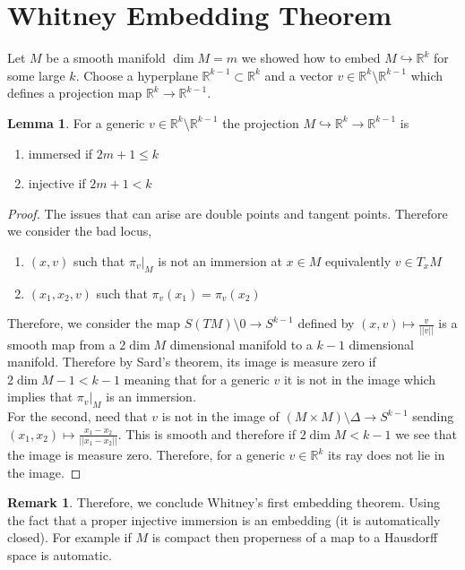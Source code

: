 \documentclass[12pt]{extarticle}
\newcommand{\R}{\mathbb{R}}
\theoremstyle{definition}
\newtheorem{lemma}[theorem]{Lemma}
\newtheorem{remark}{Remark}
\newcommand{\embed}{\hookrightarrow}
\begin{document}
\section{Whitney Embedding Theorem}

Let $M$ be a smooth manifold $\dim{M} = m$ we showed how to embed $M \embed \R^k$ for some large $k$. Choose a hyperplane $\R^{k-1} \subset \R^k$ and a vector $v \in \R^k \setminus \R^{k-1}$ which defines a projection map $\R^k \to \R^{k-1}$. 

\begin{lemma}
For a generic $v \in \R^k \setminus \R^{k-1}$ the projection $M \embed \R^k \to \R^{k-1}$ is
\begin{enumerate}
\item immersed if $2 m + 1 \le k$
\item injective if $2 m + 1 < k$
\end{enumerate}
\end{lemma}

\begin{proof}
The issues that can arise are double points and tangent points. Therefore we consider the bad locus,
\begin{enumerate}
\item $(x,v)$ such that $\pi_v |_M$ is not an immersion at $x \in M$ equivalently $v \in T_x M$
\item $(x_1, x_2, v)$ such that $\pi_v(x_1) = \pi_v(x_2)$ 
\end{enumerate}
Therefore, we consider the map $S(TM) \setminus 0 \to S^{k-1}$ defined by $(x,v) \mapsto \frac{v}{||v||}$ is a smooth map from a $2 \dim{M}$ dimensional manifold to a $k-1$ dimensional manifold. Therefore by Sard's theorem, its image is measure zero if $2 \dim{M} - 1 < k - 1$ meaning that for a generic $v$ it is not in the image which implies that $\pi_v |_M$ is an immersion.
\bigskip\\
For the second, need that $v$ is not in the image of $(M \times M) \setminus \Delta \to S^{k-1}$ sending $(x_1, x_2) \mapsto \frac{x_1 - x_2}{|| x_1 - x_2 ||}$. This is smooth and therefore if $2 \dim{M} < k - 1$ we see that the image is measure zero. Therefore, for a generic $v \in \R^{k}$ its ray does not lie in the image. 
\end{proof}

\begin{remark}
Therefore, we conclude Whitney's first embedding theorem. Using the fact that a proper injective immersion is an embedding (it is automatically closed). For example if $M$ is compact then properness of a map to a Hausdorff space is automatic.
\end{remark}
\end{document}
